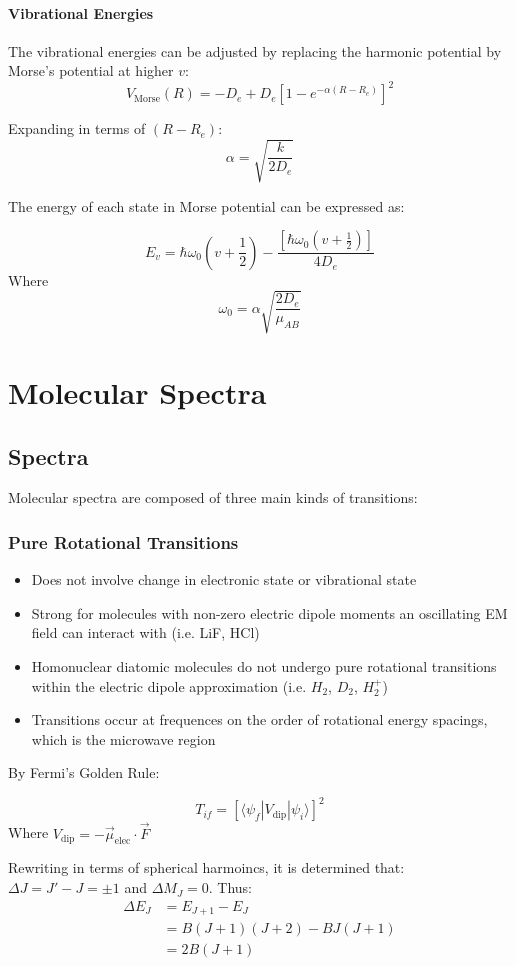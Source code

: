 \documentclass[12pt]{article}
\begin{document}
\paragraph{Vibrational Energies}
The vibrational energies can be adjusted by replacing the harmonic potential by Morse's potential at higher $v$:
\[ V_\text{Morse}(R) = -D_e + D_e[1-e^{-\alpha(R-R_e)}]^2\]

Expanding in terms of $(R-R_e)$:
\[ \alpha = \sqrt{\frac{k}{2D_e}}\]

The energy of each state in Morse potential can be expressed as:

\[E_v = \hbar \omega_0(v+\frac12) - \frac{[\hbar\omega_0(v+\frac12)]}{4D_e}\]
Where
\[\omega_0 = \alpha \sqrt{\frac{2D_e}{\mu_{AB}}}\]

\section{Molecular Spectra}

\subsection{Spectra}
Molecular spectra are composed of three main kinds of transitions:
\subsubsection{Pure Rotational Transitions}
    \begin{itemize}
        \item Does not involve change in electronic state or vibrational state
        \item Strong for molecules with non-zero electric dipole moments an oscillating EM field can interact with (i.e. LiF, HCl)
        \item Homonuclear diatomic molecules do not undergo pure rotational transitions within the electric dipole approximation (i.e. $H_2$, $D_2$, $H_2^+$)
        \item Transitions occur at frequences on the order of rotational energy spacings, which is the microwave region
    \end{itemize}
    
By Fermi's Golden Rule:

\[T_{if} = [\langle \psi_f|V_\text{dip}|\psi_i\rangle]^2\]
Where $V_\text{dip} = -\vec{\mu}_\text{elec} \cdot \vec{F}$

Rewriting in terms of spherical harmoincs, it is determined that: $\Delta J = J' - J = \pm 1$ and $\Delta M_J = 0$. Thus:
\begin{align*}
    \Delta E_J &= E_{J+1} -E_J\\
    &= B(J+1)(J+2) - BJ(J+1)\\
    &= 2B(J+1)
\end{align*}
\end{document}
